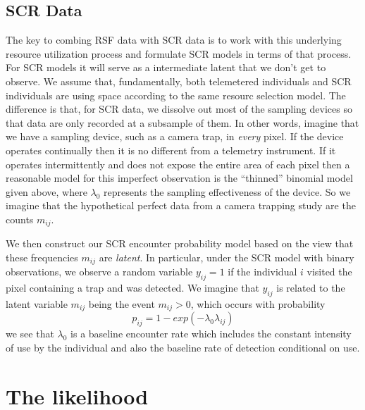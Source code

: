 \subsection{SCR Data}

The key to combing RSF data with SCR data is to work with this
underlying resource utilization process and formulate SCR models in
terms of that process. For SCR models it will serve as a intermediate
latent that we don't get to observe. We assume that, fundamentally,
both telemetered individuals and SCR individuals are using space
according to the same resourc selection model. The difference is that,
for SCR data, we dissolve out most of the sampling devices so that
data are only recorded at a subsample of them.
In other words, imagine that we have a sampling device, such as a
camera trap, in {\it every} pixel. If the device operates continually
then it is no different from a telemetry instrument. If it
operates  intermittently and does not expose the entire area of
each pixel then a reasonable model for this imperfect observation is
the ``thinned'' binomial model given above, where $\lambda_{0}$
represents the sampling effectiveness of the device. So we imagine
that the hypothetical perfect data from a camera trapping study are
the counts $m_{ij}$.

We then construct our SCR encounter probability model based on the
view that these frequencies $m_{ij}$ are {\it latent}. In particular,
under the SCR model with binary observations,
 we observe a random variable
$y_{ij} = 1$  if the individual $i$ visited the pixel
containing a trap and was detected.
We imagine that $y_{ij}$ is related to the latent variable $m_{ij}$ being the
event $m_{ij}>0$, which occurs with probability
\[
 p_{ij} = 1-exp(- \lambda_{0} \lambda_{ij})
\]
we see that $\lambda_{0}$ is a baseline encounter rate which includes
the constant intensity of use by the individual and also the baseline
rate of detection conditional on use.



\section{The likelihood}

